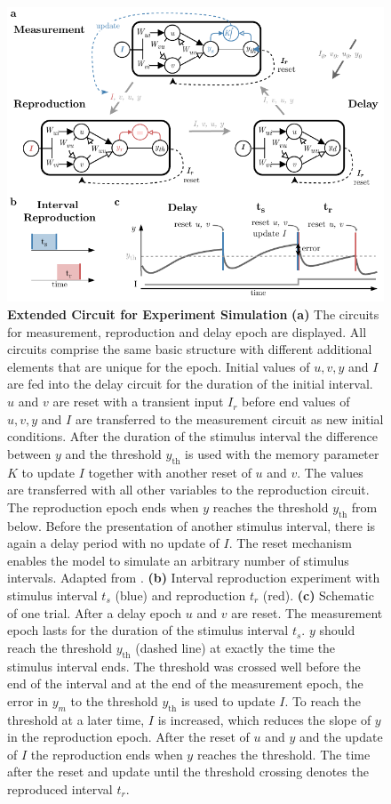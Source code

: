 \documentclass[10pt]{article}
\begin{document}
\begin{figure}
	\centering
	\includegraphics{figures/epochs.pdf}
	\caption{\textbf{Extended Circuit for Experiment Simulation} 
	\textbf{(a)} The circuits for measurement, reproduction and delay epoch are displayed. All circuits comprise the same basic structure with different additional elements that are unique for the epoch. Initial values of $u, v, y$ and $I$ are fed into the delay circuit for the duration of the initial interval. $u$ and $v$ are reset with a transient input $I_r$ before end values of $u, v, y$ and $I$ are transferred to the measurement circuit as new initial conditions. After the duration of the stimulus interval the difference between $y$ and the threshold $y_{\text{th}}$ is used with the memory parameter $K$ to update $I$ together with another reset of $u$ and $v$. The values are transferred with all other variables to the reproduction circuit. The reproduction epoch ends when $y$ reaches the threshold $y_{\text{th}}$ from below. Before the presentation of another stimulus interval, there is again a delay period with no update of $I$. The reset mechanism enables the model to simulate an arbitrary number of stimulus intervals. Adapted from \cite{Egger2020}.
	\textbf{(b)} Interval reproduction experiment with stimulus interval $t_s$ (blue) and reproduction $t_r$ (red).
	\textbf{(c)} Schematic of one trial. After a delay epoch $u$ and $v$ are reset. The measurement epoch lasts for the duration of the stimulus interval $t_s$. $y$ should reach the threshold $y_{\text{th}}$ (dashed line) at exactly the time the stimulus interval ends. The threshold was crossed well before the end of the interval and at the end of the measurement epoch, the error in $y_m$ to the threshold $y_{\text{th}}$ is used to update $I$. To reach the threshold at a later time, $I$ is increased, which reduces the slope of $y$ in the reproduction epoch. After the reset of $u$ and $y$ and the update of $I$ the reproduction ends when $y$ reaches the threshold. The time after the reset and update until the threshold crossing denotes the reproduced interval $t_r$.}
\label{fig:epochs}
\end{figure}
\end{document}
